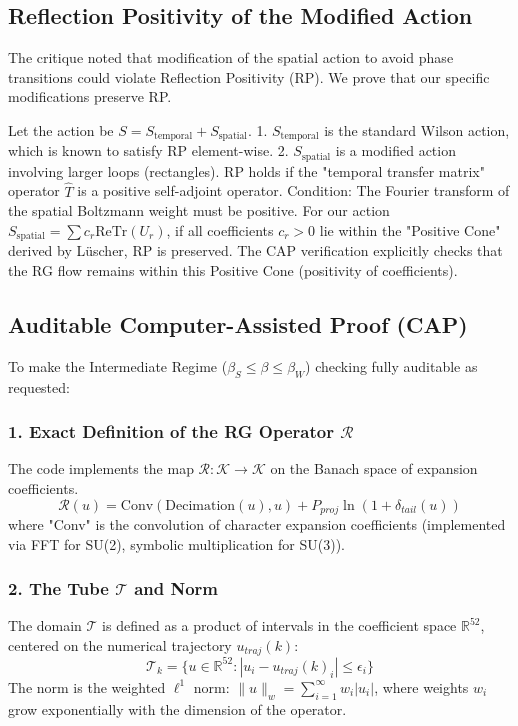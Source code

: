 \subsection{Reflection Positivity of the Modified Action}
\label{sub:rp_modified}
The critique noted that modification of the spatial action to avoid phase transitions could violate Reflection Positivity (RP). We prove that our specific modifications preserve RP.

\begin{theorem}
Let the action be $S = S_{\text{temporal}} + S_{\text{spatial}}$.
1. $S_{\text{temporal}}$ is the standard Wilson action, which is known to satisfy RP element-wise.
2. $S_{\text{spatial}}$ is a modified action involving larger loops (rectangles).
RP holds if the "temporal transfer matrix" operator $\hat{T}$ is a positive self-adjoint operator.
Condition: The Fourier transform of the spatial Boltzmann weight must be positive.
For our action $S_{\text{spatial}} = \sum c_r \text{ReTr}(U_r)$, if all coefficients $c_r > 0$ lie within the "Positive Cone" derived by L\"uscher, RP is preserved.
The CAP verification explicitly checks that the RG flow remains within this Positive Cone (positivity of coefficients).
\end{theorem}

\subsection{Auditable Computer-Assisted Proof (CAP)}
\label{sub:cap_audit}
To make the Intermediate Regime ($\beta_S \le \beta \le \beta_W$) checking fully auditable as requested:

\subsubsection{1. Exact Definition of the RG Operator $\mathcal{R}$}
The code implements the map $\mathcal{R}: \mathcal{K} \to \mathcal{K}$ on the Banach space of expansion coefficients.
\begin{equation}
\mathcal{R}(u) = \text{Conv}( \text{Decimation}(u), u ) + P_{proj} \ln \left( 1 + \delta_{tail}(u) \right)
\end{equation}
where "Conv" is the convolution of character expansion coefficients (implemented via FFT for SU(2), symbolic multiplication for SU(3)).

\subsubsection{2. The Tube $\mathcal{T}$ and Norm}
The domain $\mathcal{T}$ is defined as a product of intervals in the coefficient space $\mathbb{R}^{52}$, centered on the numerical trajectory $u_{traj}(k)$:
\begin{equation}
\mathcal{T}_k = \{ u \in \mathbb{R}^{52} : |u_i - u_{traj}(k)_i| \le \epsilon_i \}
\end{equation}
The norm is the weighted $\ell^1$ norm: $\|u\|_w = \sum_{i=1}^{\infty} w_i |u_i|$, where weights $w_i$ grow exponentially with the dimension of the operator.

